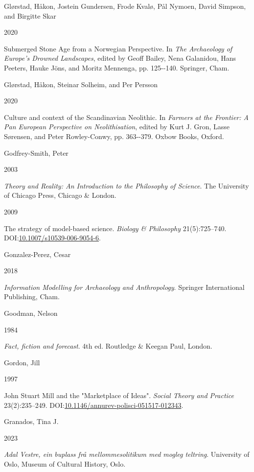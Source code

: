 \documentclass[
  12pt,
  a4paper,
  oneside]{book}
\newlength{\cslhangindent}
\newlength{\csllabelwidth}
\newlength{\cslentryspacingunit} %
\newenvironment{CSLReferences}[2] %
 {%
  \setlength{\parindent}{0pt}
  \ifodd #1
  \let\oldpar\par
  \def\par{\hangindent=\cslhangindent\oldpar}
  \fi
  \setlength{\parskip}{#2\cslentryspacingunit}
 }%
 {}
\newcommand{\CSLBlock}[1]{#1\hfill\break}
\newcommand{\CSLLeftMargin}[1]{\parbox[t]{\csllabelwidth}{#1}}
\newcommand{\CSLRightInline}[1]{\parbox[t]{\linewidth - \csllabelwidth}{#1}\break}
\begin{document}
\begin{CSLReferences}{0}{0}
\leavevmode{}%
\CSLBlock{Glørstad, Håkon, Jostein Gundersen, Frode Kvalø, Pål Nymoen, David Simpson, and Birgitte Skar}
\CSLLeftMargin{ 2020}
\CSLRightInline{{Submerged Stone Age from a Norwegian Perspective}. In \emph{{The Archaeology of Europe's Drowned Landscapes}}, edited by Geoff Bailey, Nena Galanidou, Hans Peeters, Hauke Jöns, and Moritz Mennenga, pp. 125-\/-140. Springer, Cham.}

\leavevmode{}%
\CSLBlock{Glørstad, Håkon, Steinar Solheim, and Per Persson}
\CSLLeftMargin{ 2020}
\CSLRightInline{{Culture and context of the Scandinavian Neolithic}. In \emph{{Farmers at the Frontier: A Pan European Perspective on Neolithisation}}, edited by Kurt J. Gron, Lasse Sørensen, and Peter Rowley-Conwy, pp. 363-\/-379. Oxbow Books, Oxford.}

\leavevmode{}%
\CSLBlock{Godfrey-Smith, Peter}
\CSLLeftMargin{ 2003}
\CSLRightInline{\emph{{Theory and Reality: An Introduction to the Philosophy of Science}}. The University of Chicago Press, Chicago \& London.}

\leavevmode{}%
\CSLLeftMargin{ 2009 }
\CSLRightInline{The strategy of model-based science. \emph{Biology \& Philosophy} 21(5):725--740. DOI:\href{https://doi.org/10.1007/s10539-006-9054-6}{10.1007/s10539-006-9054-6}.}

\leavevmode{}%
\CSLBlock{Gonzalez-Perez, Cesar}
\CSLLeftMargin{ 2018}
\CSLRightInline{\emph{{Information Modelling for Archaeology and Anthropology}}. Springer International Publishing, Cham.}

\leavevmode{}%
\CSLBlock{Goodman, Nelson}
\CSLLeftMargin{ 1984}
\CSLRightInline{\emph{{Fact, fiction and forecast}}. 4th ed. Routledge \& Keegan Paul, London.}

\leavevmode{}%
\CSLBlock{Gordon, Jill}
\CSLLeftMargin{ 1997}
\CSLRightInline{{John Stuart Mill and the "Marketplace of Ideas"}. \emph{Social Theory and Practice} 23(2):235--249. DOI:\href{https://doi.org/10.1146/annurev-polisci-051517-012343}{10.1146/annurev-polisci-051517-012343}.}

\leavevmode{}%
\CSLBlock{Granados, Tina J.}
\CSLLeftMargin{ 2023}
\CSLRightInline{\emph{{Adal Vestre, ein buplass frå mellommesolitikum med mogleg teltring}}. University of Oslo, Museum of Cultural History, Oslo.}


\end{CSLReferences}
\end{document}
